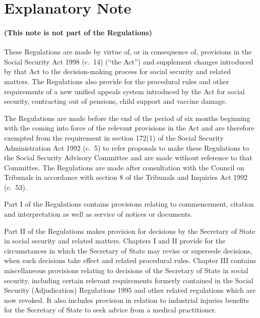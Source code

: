 \documentclass[12pt,a4paper]{article}
\begin{document}
{}


\part{Explanatory Note}

\renewcommand\parthead{--- Explanatory Note}

\subsection*{(This note is not part of the Regulations)}

 These Regulations are made by virtue of, or in consequence of, provisions in the Social Security Act 1998 (c.\ 14) (“the Act”) and supplement changes introduced by that Act to the decision-making process for social security and related matters. The Regulations also provide for the procedural rules and other requirements of a new unified appeals system introduced by the Act for social security, contracting out of pensions, child support and vaccine damage.

  The Regulations are made before the end of the period of six months beginning with the coming into force of the relevant provisions in the Act and are therefore exempted from the requirement in section 172(1) of the Social Security Administration Act 1992 (c.\ 5) to refer proposals to make these Regulations to the Social Security Advisory Committee and are made without reference to that Committee. The Regulations are made after consultation with the Council on Tribunals in accordance with section 8 of the Tribunals and Inquiries Act 1992 (c.\ 53).

  Part I of the Regulations contains provisions relating to commencement, citation and interpretation as well as service of notices or documents.

  Part II of the Regulations makes provision for decisions by the Secretary of State in social security and related matters. Chapters I and II provide for the circumstances in which the Secretary of State may revise or supersede decisions, when such decisions take effect and related procedural rules. Chapter III contains miscellaneous provisions relating to decisions of the Secretary of State in social security, including certain relevant requirements formerly contained in the Social Security (Adjudication) Regulations 1995 and other related regulations which are now revoked. It also includes provision in relation to industrial injuries benefits for the Secretary of State to seek advice from a medical practitioner.
\end{document}
